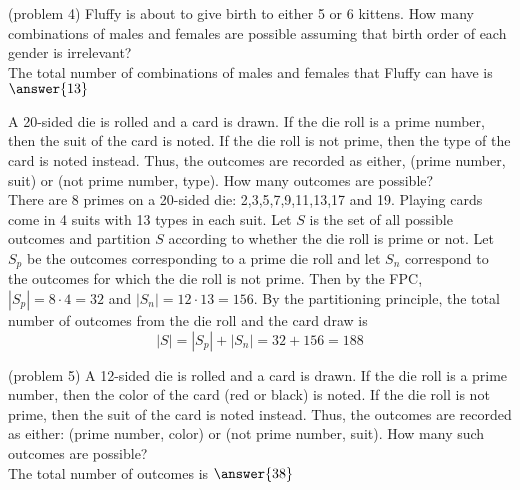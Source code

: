 \documentclass[handout]{ximera}
\begin{document}
\begin{problem}(problem 4)
Fluffy is about to give birth to either 5 or 6 kittens.  
How many combinations of males and females are possible assuming 
that birth order of each gender is irrelevant?\\
The total number of combinations of males and females that Fluffy can have is
$\answer{13}$
\end{problem}

\begin{example}[example 45]
    A 20-sided die is rolled and a card is drawn. If the die roll is a prime number, then the suit of the card is noted. If the die roll is not prime, then the type of the card is noted instead.
    Thus, the outcomes are recorded as either, (prime number, suit) or (not prime number, type). How many outcomes are possible?\\
    There are 8 primes on a 20-sided die: 2,3,5,7,9,11,13,17 and 19. Playing cards come in 4 suits with 13 types in each suit.    
    Let $S$ is the set of all possible outcomes and partition $S$ according to whether the die roll is prime or not. 
    Let $S_p$ be the outcomes corresponding to a prime die roll and let $S_n$ correspond to the outcomes for which the die roll is not prime.
    Then by the FPC, $|S_p| = 8 \cdot 4 = 32$ and $|S_n| = 12 \cdot 13 = 156$. 
     By the partitioning principle, the total number of outcomes from the die roll and the card draw is
     \[
     |S| = |S_p|+|S_n|= 32 + 156 = 188
     \]
     \end{example}
     
    
    \begin{problem}(problem 5)
        A 12-sided die is rolled and a card is drawn. If the die roll is a prime number, then the color of the card (red or black) is noted. If the die roll is not prime, 
        then the suit of the card is noted instead.  Thus, the outcomes are recorded as either: (prime number, color) or (not prime number, suit). How many such outcomes are possible?\\
    The total number of outcomes is
    $\answer{38}$
    \end{problem}
\end{document}
